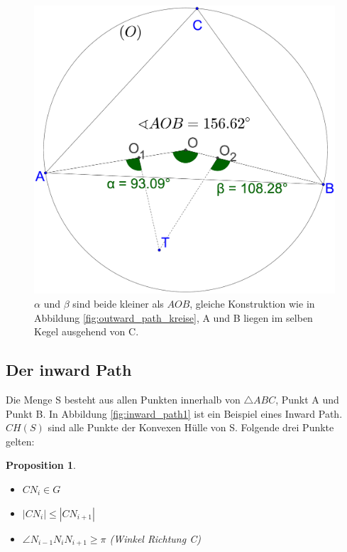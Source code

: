 \documentclass[a4paper,twoside]{IEEEtran}
\newtheorem{inwardPathProposition}{Proposition}
\begin{document}
\begin{figure}[h!]
\centering
\includegraphics[width=0.8\linewidth]{outward_path_winkel.eps}
\caption{ $\alpha $ und $\beta $ sind beide kleiner als $ AOB $, gleiche Konstruktion wie in Abbildung \ref{fig:outward_path_kreise}, A und B liegen im selben Kegel ausgehend von C.}
\label{fig:outward_path_winkel}
\end{figure}







\subsection{Der inward Path}
Die Menge S besteht aus allen Punkten innerhalb von $\triangle {ABC} $, Punkt A und Punkt B.
In Abbildung \ref{fig:inward_path1} ist ein Beispiel eines Inward Path.
$CH(S) $ sind alle Punkte der Konvexen Hülle von S. %
Folgende drei Punkte gelten:
\begin{inwardPathProposition}
\begin{itemize} %
	\item $CN_i \in G$
	\item $|CN_i| \leq |CN_{i+1}| $
	\item $\angle{N_{i-1}N_iN_{i+1}} \geq \pi $ (Winkel Richtung C)
\end{itemize} 
\end{inwardPathProposition}
\end{document}
